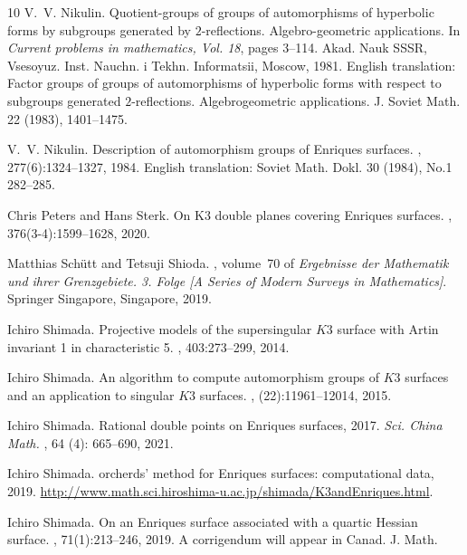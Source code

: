 \documentclass{amsart}
\numberwithin{procedure}{section}
\begin{document}
\begin{thebibliography}{10}
V.~V. Nikulin.
\newblock Quotient-groups of groups of automorphisms of hyperbolic forms by
  subgroups generated by {$2$}-reflections. {A}lgebro-geometric applications.
\newblock In {\em Current problems in mathematics, {V}ol. 18}, pages 3--114.
  Akad. Nauk SSSR, Vsesoyuz. Inst. Nauchn. i Tekhn. Informatsii, Moscow, 1981.
\newblock English translation: Factor groups of groups of automorphisms of
  hyperbolic forms with respect to subgroups generated {$2$}-reflections.
  Algebrogeometric applications. J. Soviet Math. 22 (1983), 1401--1475.

V.~V. Nikulin.
\newblock Description of automorphism groups of {E}nriques surfaces.
, 277(6):1324--1327, 1984.
\newblock English translation: Soviet Math. Dokl. 30 (1984), No.1 282--285.

Chris Peters and Hans Sterk.
\newblock On {K}3 double planes covering {E}nriques surfaces.
, 376(3-4):1599--1628, 2020.

Matthias Sch\"utt and Tetsuji Shioda.
, volume~70 of {\em Ergebnisse der
  Mathematik und ihrer Grenzgebiete. 3. Folge [A Series of Modern Surveys in
  Mathematics]}.
\newblock Springer Singapore, Singapore, 2019.

Ichiro Shimada.
\newblock Projective models of the supersingular {$K3$} surface with {A}rtin
  invariant 1 in characteristic 5.
, 403:273--299, 2014.

Ichiro Shimada.
\newblock An algorithm to compute automorphism groups of {$K3$} surfaces and an
  application to singular {$K3$} surfaces.
, (22):11961--12014, 2015.

Ichiro Shimada.
\newblock Rational double points on {E}nriques surfaces, 2017.
\newblock 
{\em Sci. China Math. }, 64 (4): 665--690, 2021. %

Ichiro Shimada.
orcherds' method for {E}nriques surfaces: computational data,
  2019.
\newblock
  \url{http://www.math.sci.hiroshima-u.ac.jp/shimada/K3andEnriques.html}.

Ichiro Shimada.
\newblock On an {E}nriques surface associated with a quartic {H}essian surface.
, 71(1):213--246, 2019.
\newblock A corrigendum will appear in Canad. J. Math.


\end{thebibliography}
\end{document}
